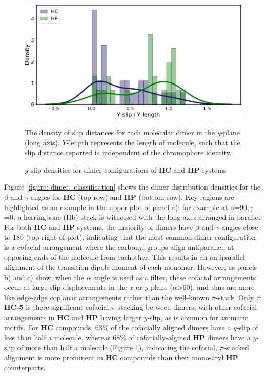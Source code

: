 \begin{figure}[H]
\centering
  \includegraphics[width=0.8\linewidth]{yslip_density}
  \caption{$y$-slip densities for dimer configurations of \textbf{HC} and \textbf{HP} systems}{The density of slip distances for each molecular dimer in the $y$-plane (long axis). $Y$-length represents the length of molecule, such that the slip distance reported is independent of the chromophore identity.}
  \label{figure: yslip_density}
\end{figure}

Figure \ref{figure: dimer_classification} shows the dimer distribution densities for the $\beta$ and $\gamma$ angles for \textbf{HC} (top row) and \textbf{HP} (bottom row). Key regions are highlighted as an example in the upper plot of panel a); for example at $\beta$=90,$\gamma$=0, a herringbone (Hb) stack is witnessed with the long axes arranged in parallel. For both \textbf{HC} and \textbf{HP} systems, the majority of dimers have $\beta$ and $\gamma$ angles close to 180\degree{} (top right of plot), indicating that the most common dimer configuration is a cofacial arrangement where the carbonyl groups align antiparallel, at opposing ends of the molecule from eachother. This results in an antiparallel alignment of the \sone{} transition dipole moment of each monomer.  However, as panels b) and c) show, when the $\alpha$ angle is used as a filter, these cofacial arrangements occur at large slip displacements in the $x$ or $y$  plane ($\alpha$\textgreater{60}), and thus are more like edge-edge coplanar arrangements rather than the well-known $\pi$-stack. Only in \textbf{HC-5} is there significant cofacial $\pi$-stacking between dimers, with other cofacial arrangements in \textbf{HC} and \textbf{HP} having larger $y$-slip, as is common  for aromatic motifs. For \textbf{HC} compounds, 63\% of the cofacially aligned dimers have a $y$-slip of less than half a molecule, whereas 68\% of cofacially-algined \textbf{HP} dimers have a $y$-slip of more than half a molecule (Figure \ref{figure: yslip_density}), indicating the cofacial, $\pi$-stacked alignment is more prominent in \textbf{HC} compounds than their mono-aryl \textbf{HP} counterparts. 

